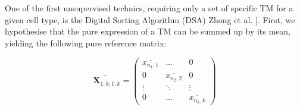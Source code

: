 %
%
%
%
%
%
\label{infer-ratios-and-pure-transcriptomic-expression}

One of the first unsupervised technics, requiring only a set of specific
TM for a given cell type, is the Digital Sorting Algorithm (DSA) Zhong
et al. \autocite{zhong_etal13}{]}. First, we
hypothesise that the pure expression of a TM can be summed up by its
mean, yielding the following pure reference matrix:

\begin{equation}
\widetilde{\boldsymbol{X}_{1:k, 1:k}}
=
\begin{pmatrix}
\overline{x_{n_1, 1}}  &\ldots & 0\\
0 & \overline{x_{n_2, 2}}   & 0\\
\vdots & \ddots & \vdots\\
0 & \ldots & \overline{x_{n_k, k}}
\end{pmatrix}
\label{eq:marker-based}
\end{equation}

